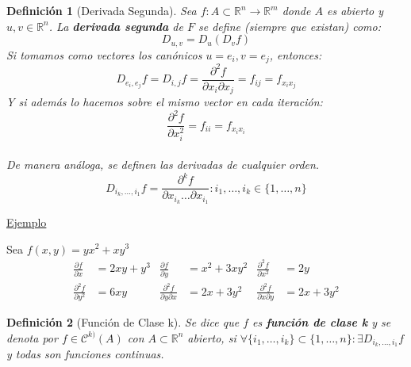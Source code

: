 \documentclass[10pt,a4paper,openright]{book}
\theoremstyle{break}
\newtheorem*{defi}{Definición}
\begin{document}
\begin{defi}[Derivada Segunda]
Sea $f: A \subset \mathbb{R}^n \to \mathbb{R}^m$ donde $A$ es abierto y $u,v \in \mathbb{R}^n$. La \textbf{derivada segunda} de $F$ se define (siempre que existan) como: 
$$D_{u,v} = D_u (D_v f)$$
Si tomamos como vectores los canónicos $u = e_i, v = e_j$, entonces:
$$D_{e_i, e_j} f = D_{i,j} f = \frac{\partial^2 f}{\partial x_i \partial x_j} = f_{ij} = f_{x_i x_j}$$
Y si además lo hacemos sobre el mismo vector en cada iteración:
$$\frac{\partial^2 f}{\partial x_i^2} = f_{ii} = f_{x_i x_i}$$\\
De manera análoga, se definen las derivadas de cualquier orden.
$$D_{i_k, \ldots, i_1} f = \frac{\partial^k f}{\partial x_{i_k} \ldots \partial x_{i_1}} : i_1, \ldots, i_k \in \{1, \ldots, n\}$$
\end{defi}

\underline{Ejemplo}

Sea $f(x,y)= yx^2 + xy^3$
\begin{align*}
\frac{\partial f}{\partial x} & = 2xy + y^3 & \frac{\partial f}{\partial y} & = x^2 + 3xy^2 & \frac{\partial^2 f}{\partial x^2} & = 2y \\ \frac{\partial^2 f}{\partial y^2} & = 6xy & \frac{\partial^2 f}{\partial y \partial x} & = 2x + 3y^2 & \frac{\partial^2 f}{ \partial x\partial y} & = 2x + 3y^2
\end{align*}

\begin{defi}[Función de Clase k]
Se dice que $f$ es \textbf{función de clase k} y se denota por $f \in \mathcal{C}^{k)} (A)$ con $A \subset \mathbb{R}^n$ abierto, si $\forall \{i_1, \ldots, i_k\} \subset \{1, \ldots, n\}: \exists D_{i_k, \ldots, i_1} f$ y todas son funciones continuas.
\end{defi}
\end{document}
